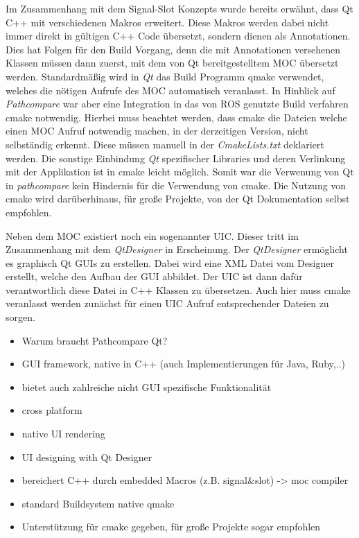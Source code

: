 Im Zusammenhang mit dem Signal-Slot Konzepts wurde bereits erwähnt, dass Qt C++
mit verschiedenen Makros erweitert. Diese Makros werden dabei nicht immer
direkt in gültigen C++ Code übersetzt, sondern dienen als Annotationen. Dies
hat Folgen für den Build Vorgang, denn die mit Annotationen versehenen Klassen
müssen dann zuerst, mit dem von Qt bereitgestelltem \gls{MOC} übersetzt werden.
Standardmäßig wird in \textit{Qt} das Build Programm qmake verwendet, welches
die nötigen Aufrufe des \gls{MOC} automatisch veranlasst. In Hinblick auf
\textit{Pathcompare} war aber eine Integration in das von \gls{ROS}
genutzte Build verfahren cmake notwendig. Hierbei muss beachtet werden,
dass cmake die Dateien welche einen \gls{MOC} Aufruf notwendig machen, in der
derzeitigen Version, nicht selbständig erkennt. Diese müssen manuell in der
\textit{CmakeLists.txt} deklariert werden. Die sonstige Einbindung
\textit{Qt} spezifischer Libraries und deren Verlinkung mit der Applikation ist
in cmake leicht möglich. Somit war die Verwenung von Qt in
\textit{pathcompare} kein Hindernis für die Verwendung von cmake.
Die Nutzung von cmake wird darüberhinaus, für große Projekte, von der 
Qt Dokumentation selbst empfohlen.

Neben dem \gls{MOC} existiert noch ein sogenannter \gls{UIC}. Dieser tritt im
Zusammenhang mit dem \textit{QtDesigner} in Erscheinung. Der
\textit{QtDesigner} ermöglicht es graphisch Qt GUIs zu erstellen. Dabei wird
eine XML Datei vom Designer erstellt, welche den Aufbau der GUI abbildet.
Der UIC ist dann dafür verantwortlich diese Datei in C++ Klassen zu übersetzen.
Auch hier muss cmake veranlasst werden zunächst für einen \gls{UIC} Aufruf
entsprechender Dateien zu sorgen.

\begin{itemize}
  \item Warum braucht Pathcompare Qt?
  \item GUI framework, native in C++ (auch Implementierungen für Java, Ruby,..)
  \item bietet auch zahlreiche nicht GUI spezifische Funktionalität
  \item cross platform
  \item native UI rendering
  \item UI designing with Qt Designer
  \item bereichert C++ durch embedded Macros (z.B. signal\&slot) -> moc compiler
  \item standard Buildsystem native qmake 
  \item Unterstützung für cmake gegeben, für große Projekte sogar empfohlen
\end{itemize}


